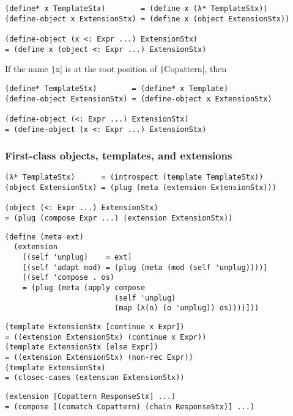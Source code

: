 \begin{verbatim}
(define* x TemplateStx)        = (define x (λ* TemplateStx))
(define-object x ExtensionStx) = (define x (object ExtensionStx))

(define-object (x <: Expr ...) ExtensionStx)
= (define x (object <: Expr ...) ExtensionStx)
\end{verbatim}
If the name \texttt|x| is at the root position of
\texttt|Copattern|, then
\begin{verbatim}
(define* TemplateStx)        = (define* x Template)
(define-object ExtensionStx) = (define-object x ExtensionStx)

(define-object (<: Expr ...) ExtensionStx)
= (define-object (x <: Expr ...) ExtensionStx)
\end{verbatim}

\subsubsection{First-class objects, templates, and extensions}

\begin{verbatim}
(λ* TemplateStx)      = (introspect (template TemplateStx))
(object ExtensionStx) = (plug (meta (extension ExtensionStx)))

(object (<: Expr ...) ExtensionStx)
= (plug (compose Expr ...) (extension ExtensionStx))
\end{verbatim}

\begin{verbatim}
(define (meta ext)
  (extension
    [(self 'unplug)    = ext]
    [(self 'adapt mod) = (plug (meta (mod (self 'unplug))))]
    [(self 'compose . os)
    = (plug (meta (apply compose
                         (self 'unplug)
                         (map (λ(o) (o 'unplug)) os))))]))
\end{verbatim}

\begin{verbatim}
(template ExtensionStx [continue x Expr])
= ((extension ExtensionStx) (continue x Expr))
(template ExtensionStx [else Expr])
= ((extension ExtensionStx) (non-rec Expr))
(template ExtensionStx)
= (closec-cases (extension ExtensionStx))
\end{verbatim}

\begin{verbatim}
(extension [Copattern ResponseStx] ...)
= (compose [(comatch Copattern) (chain ResponseStx)] ...)
\end{verbatim}

